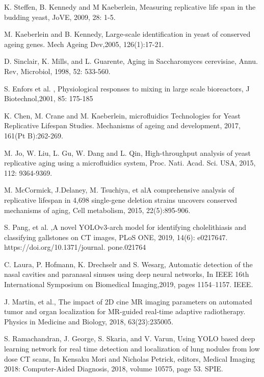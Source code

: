 \documentclass[conference]{IEEEtran}
\begin{document}
\begin{thebibliography}{00}

K. Steffen, B. Kennedy and M Kaeberlein, Measuring replicative life span in the budding yeast, JoVE, 2009,  28: 1-5.


M. Kaeberlein and B. Kennedy, Large-scale identification in yeast of conserved ageing genes. Mech Ageing Dev,2005, 126(1):17-21.


D. Sinclair, K. Mills, and L. Guarente,  Aging in Saccharomyces cerevisiae, Annu. Rev,  Microbiol, 1998, 52: 533-560.



S. Enfors  et al. , Physiological responses to mixing in large scale bioreactors, J Biotechnol,2001, 85: 175-185



K. Chen, M. Crane and  M. Kaeberlein, microfluidics Technologies for Yeast Replicative Lifespan Studies. Mechanisms of ageing and development, 2017, 161(Pt B):262-269.



 M. Jo, W. Liu, L. Gu, W. Dang and  L. Qin, High-throughput analysis of yeast replicative aging using a microfluidics system, Proc. Nati. Acad. Sci. USA, 2015, 112: 9364-9369.



M. McCormick,  J.Delaney, M. Tsuchiya, et alA comprehensive analysis of replicative lifespan in 4,698 single-gene deletion strains uncovers conserved mechanisms of aging, Cell metabolism, 2015, 22(5):895-906.


S. Pang,  et al. ,A novel YOLOv3-arch model for identifying cholelithiasis and classifying gallstones on CT images, PLoS ONE, 2019, 14(6): e0217647. https://doi.org/10.1371/journal. pone.021764

C.  Laura, P. Hofmann, K. Drechselr  and S. Wesarg, Automatic detection of the nasal cavities and paranasal sinuses using deep neural networks, In IEEE 16th International Symposium on Biomedical Imaging,2019, pages 1154–1157. IEEE.

J. Martin, et al., The impact of 2D cine MR imaging parameters on automated tumor and organ localization for MR-guided real-time adaptive radiotherapy. Physics in Medicine and Biology, 2018, 63(23):235005.

S. Ramachandran, J. George, S. Skaria, and  V. Varun,  Using YOLO based deep learning network for real time detection and localization of lung nodules from low dose CT scans, In Kensaku Mori and Nicholas Petrick, editors, Medical Imaging 2018: Computer-Aided Diagnosis, 2018, volume 10575, page 53. SPIE.


\end{thebibliography}
\end{document}
